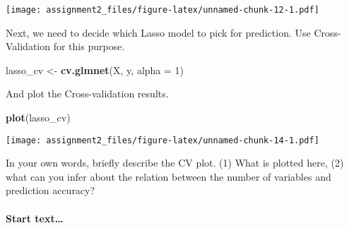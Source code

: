 \documentclass[
]{article}
\newenvironment{Shaded}{\begin{snugshade}}{\end{snugshade}}
\newcommand{\AttributeTok}[1]{\textcolor[rgb]{0.13,0.29,0.53}{#1}}
\newcommand{\DecValTok}[1]{\textcolor[rgb]{0.00,0.00,0.81}{#1}}
\newcommand{\FunctionTok}[1]{\textcolor[rgb]{0.13,0.29,0.53}{\textbf{#1}}}
\newcommand{\NormalTok}[1]{#1}
\newcommand{\OtherTok}[1]{\textcolor[rgb]{0.56,0.35,0.01}{#1}}
\begin{document}
\texttt{[image: assignment2\_files/figure-latex/unnamed-chunk-12-1.pdf]}

Next, we need to decide which Lasso model to pick for prediction. Use
Cross-Validation for this purpose.

\begin{Shaded}
\begin{Highlighting}[]
\NormalTok{lasso\_cv }\OtherTok{\textless{}{-}} \FunctionTok{cv.glmnet}\NormalTok{(X, y, }\AttributeTok{alpha =} \DecValTok{1}\NormalTok{)}
\end{Highlighting}
\end{Shaded}

And plot the Cross-validation results.

\begin{Shaded}
\begin{Highlighting}[]
\FunctionTok{plot}\NormalTok{(lasso\_cv)}
\end{Highlighting}
\end{Shaded}

\texttt{[image: assignment2\_files/figure-latex/unnamed-chunk-14-1.pdf]}

In your own words, briefly describe the CV plot. (1) What is plotted
here, (2) what can you infer about the relation between the number of
variables and prediction accuracy?

\hypertarget{start-text}{%
\paragraph{Start text\ldots{}}\label{start-text}}
\end{document}
